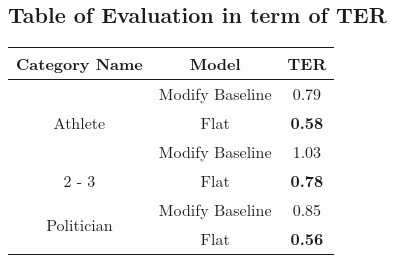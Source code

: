 \documentclass{article}%
\begin{document}
%
\subsection{Table of Evaluation in term of TER \newline%
}%
\begin{tabular}{|c|c|c|}%
\hline%
\textbf{Category Name}&\textbf{Model}&\textbf{TER}\\%
\hline%
\multirow{3}{*}{Athlete}&Modify Baseline&0.79\\%
\cline{2%
-%
3}%
&Flat&\textbf{0.58}\\%
\hline%
\hline%
\multirow{3}{*}{Artist}&Modify Baseline&1.03\\%
\cline{2%
-%
3}%
&Flat&\textbf{0.78}\\%
\hline%
\hline%
\multirow{3}{*}{Politician}&Modify Baseline&0.85\\%
\cline{2%
-%
3}%
&Flat&\textbf{0.56}\\%
\hline%
\hline%
\end{tabular}

%
\end{document}
